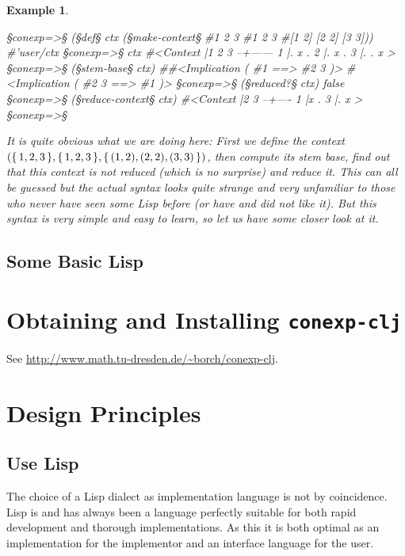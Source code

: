 \documentclass{scrbook}
\newcommand{\conexpclj}{\texttt{conexp-clj}}
\newcommand{\set}[1]{\{\,#1\,\}}
\newcommand{\s}{\color{blue}}
\newcommand{\p}{\color{lightblue}}
\theoremstyle{plain}
\theoremstyle{plain}
\newtheorem{Example}     [Theorem] {Example}
\theoremstyle{plain}
\theoremstyle{nonumberplain}
\begin{document}
\begin{Example}~
  \begin{conexp}
    §\p conexp=>§ (§\s def§ ctx (§\s make-context§ #{1 2 3} #{1 2 3} #{[1 2] [2 2] [3 3]}))
    #'user/ctx
    §\p conexp=>§ ctx
    #<Context
      |1 2 3
    --+------
    1 |. x .
    2 |. x .
    3 |. . x
    >
    §\p conexp=>§ (§\s stem-base§ ctx)
    #{#<Implication ( #{1}  ==>  #{2 3} )> #<Implication ( #{2 3}  ==>  #{1} )>}
    §\p conexp=>§ (§\s reduced?§ ctx)
    false
    §\p conexp=>§ (§\s reduce-context§ ctx)
    #<Context
      |2 3
    --+----
    1 |x .
    3 |. x
    >
    §\p conexp=>§
  \end{conexp}

  It is quite obvious what we are doing here: First we define the
  context $(\set{1,2,3},\set{1,2,3},\break\set{(1,2),(2,2),(3,3)})$,
  then compute its stem base, find out that this context is not
  reduced (which is no surprise) and reduce it. This can all be
  guessed but the actual syntax looks quite strange and very
  unfamiliar to those who never have seen some Lisp before (or have
  and did not like it). But this syntax is very simple and easy to
  learn, so let us have some closer look at it.
\end{Example}

\subsection{Some Basic Lisp}

\section{Obtaining and Installing \conexpclj}

See \url{http://www.math.tu-dresden.de/~borch/conexp-clj}.


\section{Design Principles}

\subsection{Use Lisp}
The choice of a Lisp dialect as implementation language is not by
coincidence. Lisp is and has always been a language perfectly suitable
for both rapid development and thorough implementations. As this it is
both optimal as an implementation for the implementor and an interface
language for the user.
\end{document}
